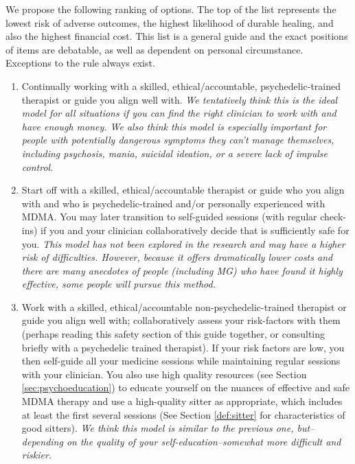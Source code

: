\documentclass[12pt,letterpaper]{book}
\begin{document}
We propose the following ranking of options. The top of the list represents the lowest risk of adverse outcomes, the highest likelihood of durable healing, and also the highest financial cost. This list is a general guide and the exact positions of items are debatable, as well as dependent on personal circumstance. Exceptions to the rule always exist.
\begin{enumerate}
    \item Continually working with a skilled, ethical/accountable, psychedelic-trained therapist or guide you align well with. \textit{We tentatively think this is the ideal model for all situations if you can find the right clinician to work with and have enough money. We also think this model is especially important for people with potentially dangerous symptoms they can't manage themselves, including psychosis, mania, suicidal ideation, or a severe lack of impulse control.}
    \item Start off with a skilled, ethical/accountable therapist or guide who you align with and who is psychedelic-trained and/or personally experienced with MDMA. You may later transition to self-guided sessions (with regular check-ins) if you and your clinician collaboratively decide that is sufficiently safe for you. \textit{This model has not been explored in the research and may have a higher risk of difficulties. However, because it offers dramatically lower costs and there are many anecdotes of people (including MG) who have found it highly effective, some people will pursue this method.}
    \item Work with a skilled, ethical/accountable non-psychedelic-trained therapist or guide you align well with; collaboratively assess your risk-factors with them (perhaps reading this safety section of this guide together, or consulting briefly with a psychedelic trained therapist). If your risk factors are low, you then self-guide all your medicine sessions while maintaining regular sessions with your clinician. You also use high quality resources (see Section \ref{sec:psychoeducation}) to educate yourself on the nuances of effective and safe MDMA therapy and use a high-quality sitter as appropriate, which includes at least the first several sessions (See Section \ref{def:sitter} for characteristics of good sitters). \textit{We think this model is similar to the previous one, but–depending on the quality of your self-education–somewhat more difficult and riskier.}

\end{enumerate}
\end{document}
